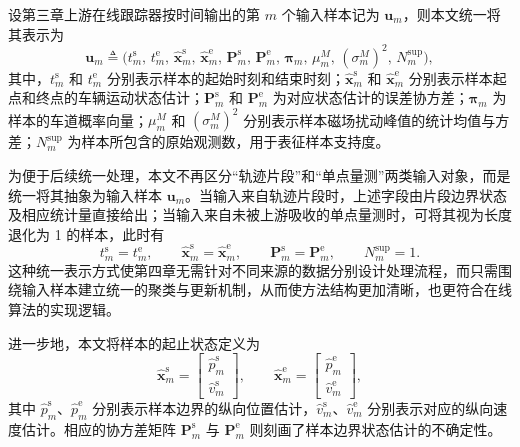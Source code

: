 \documentclass{xdupgthesis}
\begin{document}
设第三章上游在线跟踪器按时间输出的第 $m$ 个输入样本记为 $\mathbf{u}_m$，则本文统一将其表示为
\begin{equation}
	\mathbf{u}_m \triangleq
	\Big(
	t_m^{\mathrm{s}},\, t_m^{\mathrm{e}},\,
	\hat{\mathbf{x}}_m^{\mathrm{s}},\, \hat{\mathbf{x}}_m^{\mathrm{e}},\,
	\mathbf{P}_m^{\mathrm{s}},\, \mathbf{P}_m^{\mathrm{e}},\,
	\boldsymbol{\pi}_m,\,
	\mu_m^{M},\, (\sigma_m^{M})^{2},\,
	N_m^{\mathrm{sup}}
	\Big),
\end{equation}
其中，$t_m^{\mathrm{s}}$ 和 $t_m^{\mathrm{e}}$ 分别表示样本的起始时刻和结束时刻；$\hat{\mathbf{x}}_m^{\mathrm{s}}$ 和 $\hat{\mathbf{x}}_m^{\mathrm{e}}$ 分别表示样本起点和终点的车辆运动状态估计；$\mathbf{P}_m^{\mathrm{s}}$ 和 $\mathbf{P}_m^{\mathrm{e}}$ 为对应状态估计的误差协方差；$\boldsymbol{\pi}_m$ 为样本的车道概率向量；$\mu_m^{M}$ 和 $(\sigma_m^{M})^{2}$ 分别表示样本磁场扰动峰值的统计均值与方差；$N_m^{\mathrm{sup}}$ 为样本所包含的原始观测数，用于表征样本支持度。

为便于后续统一处理，本文不再区分“轨迹片段”和“单点量测”两类输入对象，而是统一将其抽象为输入样本 $\mathbf{u}_m$。当输入来自轨迹片段时，上述字段由片段边界状态及相应统计量直接给出；当输入来自未被上游吸收的单点量测时，可将其视为长度退化为 1 的样本，此时有
\begin{equation}
	t_m^{\mathrm{s}} = t_m^{\mathrm{e}}, \qquad
	\hat{\mathbf{x}}_m^{\mathrm{s}} = \hat{\mathbf{x}}_m^{\mathrm{e}}, \qquad
	\mathbf{P}_m^{\mathrm{s}} = \mathbf{P}_m^{\mathrm{e}}, \qquad
	N_m^{\mathrm{sup}} = 1.
\end{equation}
这种统一表示方式使第四章无需针对不同来源的数据分别设计处理流程，而只需围绕输入样本建立统一的聚类与更新机制，从而使方法结构更加清晰，也更符合在线算法的实现逻辑。

进一步地，本文将样本的起止状态定义为
\begin{equation}
	\hat{\mathbf{x}}_m^{\mathrm{s}}=
	\begin{bmatrix}
		\hat p_m^{\mathrm{s}}\\[2pt]
		\hat v_m^{\mathrm{s}}
	\end{bmatrix},
	\qquad
	\hat{\mathbf{x}}_m^{\mathrm{e}}=
	\begin{bmatrix}
		\hat p_m^{\mathrm{e}}\\[2pt]
		\hat v_m^{\mathrm{e}}
	\end{bmatrix},
\end{equation}
其中 $\hat p_m^{\mathrm{s}}$、$\hat p_m^{\mathrm{e}}$ 分别表示样本边界的纵向位置估计，$\hat v_m^{\mathrm{s}}$、$\hat v_m^{\mathrm{e}}$ 分别表示对应的纵向速度估计。相应的协方差矩阵 $\mathbf{P}_m^{\mathrm{s}}$ 与 $\mathbf{P}_m^{\mathrm{e}}$ 则刻画了样本边界状态估计的不确定性。
\end{document}
